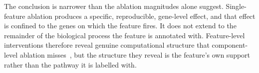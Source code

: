 The conclusion is narrower than the ablation magnitudes alone suggest. Single-feature ablation
produces a specific, reproducible, gene-level effect, and that effect is confined to the genes on
which the feature fires. It does not extend to the remainder of the biological process the feature
is annotated with. Feature-level interventions therefore reveal genuine computational structure
that component-level ablation misses~\cite{kendiukhov2025systematic}, but the structure they reveal
is the feature's own support rather than the pathway it is labelled with.
